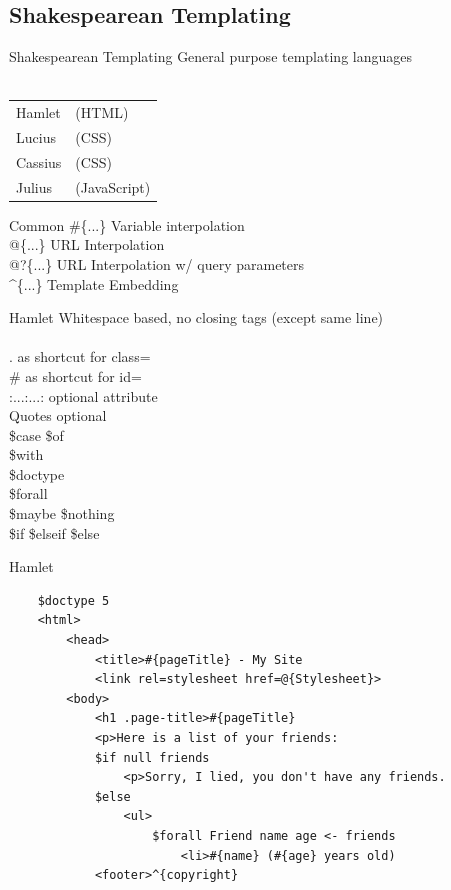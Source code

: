 \documentclass[pdf]{beamer}
\begin{document}
\subsection{Shakespearean Templating}
\begin{frame}{Shakespearean Templating}
  General purpose templating languages\\
  \\
  \begin{tabular}{ l l }
    Hamlet  & (HTML)\\
    Lucius  & (CSS)\\
    Cassius & (CSS)\\
    Julius  & (JavaScript)\\
  \end{tabular}
\end{frame}

\begin{frame}{Common}
  \#\{...\} Variable interpolation\\
  @\{...\} URL Interpolation\\
  @?\{...\} URL Interpolation w/ query parameters\\
  \textasciicircum\{...\} Template Embedding\\
\end{frame}

\begin{frame}{Hamlet}
  Whitespace based, no closing tags (except same line)\\
  \\
  . as shortcut for class=\\
  \# as shortcut for id=\\
  :...:...: optional attribute\\
  Quotes optional\\
  \$case \$of \\
  \$with \\
  \$doctype \\
  \$forall \\
  \$maybe \$nothing\\
  \$if \$elseif \$else\\
\end{frame}

\begin{frame}[fragile]{Hamlet}
  \begin{verbatim}
    $doctype 5
    <html>
        <head>
            <title>#{pageTitle} - My Site
            <link rel=stylesheet href=@{Stylesheet}>
        <body>
            <h1 .page-title>#{pageTitle}
            <p>Here is a list of your friends:
            $if null friends
                <p>Sorry, I lied, you don't have any friends.
            $else
                <ul>
                    $forall Friend name age <- friends
                        <li>#{name} (#{age} years old)
            <footer>^{copyright}
  \end{verbatim}
\end{frame}
\end{document}
